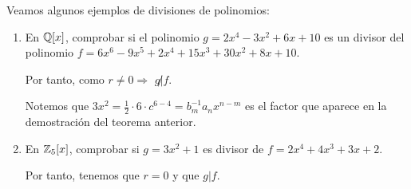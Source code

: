 \begin{ejemplo} Veamos algunos ejemplos de divisiones de polinomios:
\begin{enumerate}
    \item En $\mathbb Q[x]$, comprobar si el polinomio $g=2x^4-3x^2+6x+10$ es un divisor del polinomio $f=6x^6-9x^5+2x^4+15x^3+30x^2+8x+10$.
    
    \begin{center} %
    \end{center}

    Por tanto, como $r\neq0 \Longrightarrow$ $g\not|f$.

    Notemos que $3x^2=\frac{1}{2}\cdot 6 \cdot c^{6-4} = b_m^{-1}a_nx^{n-m}$ es el factor que aparece en la demostración del teorema anterior.
    
    \item En $\mathbb Z_5[x]$, comprobar si $g=3x^2+1$ es divisor de $f=2x^4+4x^3+3x+2$.
    \begin{center}
    \end{center}
    
    Por tanto, tenemos que $r=0$ y que $g|f$.
\end{enumerate}
\end{ejemplo}

